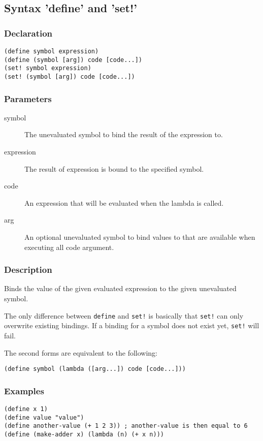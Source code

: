 \subsection{Syntax 'define' and 'set!'}
\label{builtins/define}

\subsubsection*{Declaration}
\begin{lstlisting}
(define symbol expression)
(define (symbol [arg]) code [code...])
(set! symbol expression)
(set! (symbol [arg]) code [code...])
\end{lstlisting}

\subsubsection*{Parameters}
\begin{description}
	\item[symbol] The unevaluated symbol to bind the result of the expression to.
	\item[expression] The result of expression is bound to the specified symbol.
	\item[code] An expression that will be evaluated when the lambda is called.
	\item[arg] An optional unevaluated symbol to bind values to that are available when executing all code argument.
\end{description}

\subsubsection*{Description}
Binds the value of the given evaluated expression to the given unevaluated symbol.

The only difference between \lstinline|define| and \lstinline|set!| is basically that \lstinline|set!| can only overwrite existing bindings. If a binding for a symbol does not exist yet, \lstinline|set!| will fail.

The second forms are equivalent to the following:
\begin{lstlisting}
(define symbol (lambda ([arg...]) code [code...]))
\end{lstlisting}

\subsubsection*{Examples}
\begin{lstlisting}
(define x 1)
(define value "value")
(define another-value (+ 1 2 3)) ; another-value is then equal to 6
(define (make-adder x) (lambda (n) (+ x n)))
\end{lstlisting}
